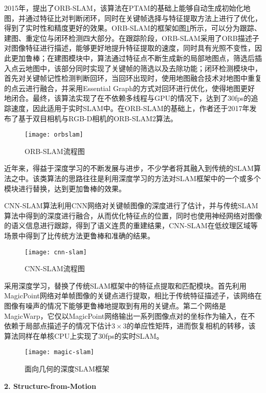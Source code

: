 2015年，\citet{mur2015orb}提出了ORB-SLAM，该算法在PTAM的基础上能够自动生成初始化地图，并通过特征比对判断闭环，同时在关键帧选择与特征提取方法上进行了优化，得到了实时性和精度更好的效果。ORB-SLAM的框架如图\ref{orbslam}所示，可以分为跟踪、建图、重定位与闭环检测四大部分。在跟踪阶段，ORB-SLAM采用了ORB描述子\cite{rublee2011orb}对图像特征进行描述，能够更好地提升特征提取的速度，同时具有光照不变性，因此更加鲁棒；在建图模块中，算法通过特征点不断生成新的局部地图点，筛选后插入点云地图中，该部分同时实现了关键帧的筛选以及去除功能；闭环检测模块中，首先对关键帧记性检测判断回环，当回环出现时，使用地图融合技术对地图中重复的点云进行融合，并采用Essential Graph的方式对回环进行优化，使得地图更好地闭合。最终，该算法实现了在不依赖多线程与GPU的情况下，达到了30fps的追踪速度，因此适用于实时SLAM中。在ORB-SLAM的基础上，作者还于2017年发布了基于双目相机与RGB-D相机的ORB-SLAM2算法\cite{mur2017orb}。
\begin{figure}
	\centering
	\texttt{[image: orbslam]}
	\caption{ORB-SLAM流程图}
	\label{orbslam}
\end{figure}

近年来，得益于深度学习的不断发展与进步，不少学者将其融入到传统的SLAM算法之中。该类算法的思路往往是利用深度学习的方法对SLAM框架中的一个或多个模块进行替换，达到更加鲁棒的效果。

CNN-SLAM\cite{tateno2017cnn}算法利用CNN网络对关键帧图像的深度进行了估计，并与传统SLAM算法中得到的深度进行融合，从而优化特征点的位置，同时也使用神经网络对图像的语义信息进行跟踪，得到了语义连贯的重建结果，CNN-SLAM在低纹理区域等场景中得到了比传统方法更鲁棒和准确的结果。
\begin{figure}
	\centering
	\texttt{[image: cnn-slam]}
	\caption{CNN-SLAM流程图}
	\label{cnn-slam}
\end{figure}

\citet{detone2017toward}采用深度学习，替换了传统SLAM框架中的特征点提取和匹配模块。首先利用MagicPoint网络对单帧图像的关键点进行提取，相比于传统特征描述子，该网络在图像有噪声的情况下能够更鲁棒地提取到有用的关键点。第二个网络是MagicWarp，它仅以MagicPoint网络输出一系列图像点对的坐标作为输入，在不依赖于局部点描述子的情况下估计$3\times 3$的单应性矩阵，进而恢复相机的转移，该算法同样在单核CPU上实现了30fps的实时SLAM。
\begin{figure}
	\centering
	\texttt{[image: magic-slam]}
	\caption{面向几何的深度SLAM框架}
	\label{magic-slam}
\end{figure}

\textbf{2. Structure-from-Motion}

